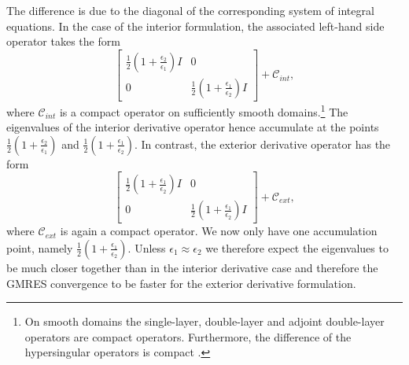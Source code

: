 The difference is due to the diagonal of the corresponding system of integral equations.
In the case of the interior formulation, the associated left-hand side operator takes the form
$$
\begin{bmatrix}\frac{1}{2}(1 + \frac{\epsilon_2}{\epsilon_1})I & 0 \\ 0 & \frac{1}{2}(1 + \frac{\epsilon_1}{\epsilon_2})I
\end{bmatrix} + \mathcal{C}_{int},
$$
where $\mathcal{C}_{int}$ is a compact operator on sufficiently smooth domains.\footnote{On smooth domains the single-layer, double-layer and adjoint double-layer operators are compact operators.
Furthermore, the difference of the hypersingular operators is compact \cite{Hiptmair2006-om}.}
The eigenvalues of the interior derivative operator hence accumulate at the points $\frac{1}{2}(1 + \frac{\epsilon_2}{\epsilon_1})$ and $\frac{1}{2}(1 + \frac{\epsilon_1}{\epsilon_2})$.
In contrast, the exterior derivative operator has the form
$$
\begin{bmatrix}\frac{1}{2}(1 + \frac{\epsilon_1}{\epsilon_2})I & 0 \\ 0 & \frac{1}{2}(1 + \frac{\epsilon_1}{\epsilon_2})I
\end{bmatrix} + \mathcal{C}_{ext},
$$
where $\mathcal{C}_{ext}$ is again a compact operator.
We now only have one accumulation point, namely $\frac{1}{2}(1 + \frac{\epsilon_1}{\epsilon_2})$.
Unless $\epsilon_1\approx \epsilon_2$ we therefore expect the eigenvalues to be much closer together than in the interior derivative case and therefore the GMRES convergence to be faster for the exterior derivative formulation.

